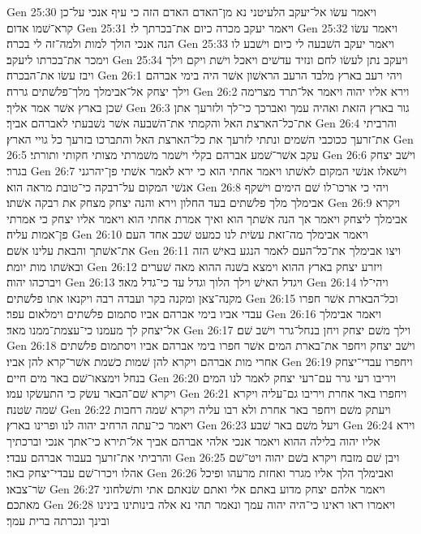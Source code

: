 Gen 25:30  ויאמר עשׂו אל־יעקב הלעיטני נא מן־האדם האדם הזה כי עיף אנכי על־כן קרא־שׁמו אדום׃
Gen 25:31  ויאמר יעקב מכרה כיום את־בכרתך לי׃
Gen 25:32  ויאמר עשׂו הנה אנכי הולך למות ולמה־זה לי בכרה׃
Gen 25:33  ויאמר יעקב השׁבעה לי כיום וישׁבע לו וימכר את־בכרתו ליעקב׃
Gen 25:34  ויעקב נתן לעשׂו לחם ונזיד עדשׁים ויאכל וישׁת ויקם וילך ויבז עשׂו את־הבכרה׃
Gen 26:1  ויהי רעב בארץ מלבד הרעב הראשׁון אשׁר היה בימי אברהם וילך יצחק אל־אבימלך מלך־פלשׁתים גררה׃
Gen 26:2  וירא אליו יהוה ויאמר אל־תרד מצרימה שׁכן בארץ אשׁר אמר אליך׃
Gen 26:3  גור בארץ הזאת ואהיה עמך ואברכך כי־לך ולזרעך אתן את־כל־הארצת האל והקמתי את־השׁבעה אשׁר נשׁבעתי לאברהם אביך׃
Gen 26:4  והרביתי את־זרעך ככוכבי השׁמים ונתתי לזרעך את כל־הארצת האל והתברכו בזרעך כל גויי הארץ׃
Gen 26:5  עקב אשׁר־שׁמע אברהם בקלי וישׁמר משׁמרתי מצותי חקותי ותורתי׃
Gen 26:6  וישׁב יצחק בגרר׃
Gen 26:7  וישׁאלו אנשׁי המקום לאשׁתו ויאמר אחתי הוא כי ירא לאמר אשׁתי פן־יהרגני אנשׁי המקום על־רבקה כי־טובת מראה הוא׃
Gen 26:8  ויהי כי ארכו־לו שׁם הימים וישׁקף אבימלך מלך פלשׁתים בעד החלון וירא והנה יצחק מצחק את רבקה אשׁתו׃
Gen 26:9  ויקרא אבימלך ליצחק ויאמר אך הנה אשׁתך הוא ואיך אמרת אחתי הוא ויאמר אליו יצחק כי אמרתי פן־אמות עליה׃
Gen 26:10  ויאמר אבימלך מה־זאת עשׂית לנו כמעט שׁכב אחד העם את־אשׁתך והבאת עלינו אשׁם׃
Gen 26:11  ויצו אבימלך את־כל־העם לאמר הנגע באישׁ הזה ובאשׁתו מות יומת׃
Gen 26:12  ויזרע יצחק בארץ ההוא וימצא בשׁנה ההוא מאה שׁערים ויברכהו יהוה׃
Gen 26:13  ויגדל האישׁ וילך הלוך וגדל עד כי־גדל מאד׃
Gen 26:14  ויהי־לו מקנה־צאן ומקנה בקר ועבדה רבה ויקנאו אתו פלשׁתים׃
Gen 26:15  וכל־הבארת אשׁר חפרו עבדי אביו בימי אברהם אביו סתמום פלשׁתים וימלאום עפר׃
Gen 26:16  ויאמר אבימלך אל־יצחק לך מעמנו כי־עצמת־ממנו מאד׃
Gen 26:17  וילך משׁם יצחק ויחן בנחל־גרר וישׁב שׁם׃
Gen 26:18  וישׁב יצחק ויחפר את־בארת המים אשׁר חפרו בימי אברהם אביו ויסתמום פלשׁתים אחרי מות אברהם ויקרא להן שׁמות כשׁמת אשׁר־קרא להן אביו׃
Gen 26:19  ויחפרו עבדי־יצחק בנחל וימצאו־שׁם באר מים חיים׃
Gen 26:20  ויריבו רעי גרר עם־רעי יצחק לאמר לנו המים ויקרא שׁם־הבאר עשׂק כי התעשׂקו עמו׃
Gen 26:21  ויחפרו באר אחרת ויריבו גם־עליה ויקרא שׁמה שׂטנה׃
Gen 26:22  ויעתק משׁם ויחפר באר אחרת ולא רבו עליה ויקרא שׁמה רחבות ויאמר כי־עתה הרחיב יהוה לנו ופרינו בארץ׃
Gen 26:23  ויעל משׁם באר שׁבע׃
Gen 26:24  וירא אליו יהוה בלילה ההוא ויאמר אנכי אלהי אברהם אביך אל־תירא כי־אתך אנכי וברכתיך והרביתי את־זרעך בעבור אברהם עבדי׃
Gen 26:25  ויבן שׁם מזבח ויקרא בשׁם יהוה ויט־שׁם אהלו ויכרו־שׁם עבדי־יצחק באר׃
Gen 26:26  ואבימלך הלך אליו מגרר ואחזת מרעהו ופיכל שׂר־צבאו׃
Gen 26:27  ויאמר אלהם יצחק מדוע באתם אלי ואתם שׂנאתם אתי ותשׁלחוני מאתכם׃
Gen 26:28  ויאמרו ראו ראינו כי־היה יהוה עמך ונאמר תהי נא אלה בינותינו בינינו ובינך ונכרתה ברית עמך׃
